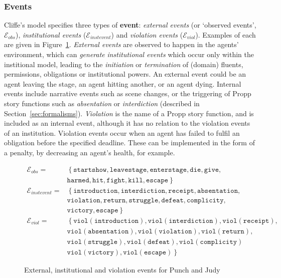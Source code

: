 \documentclass[11pt]{report}
\begin{document}
\subsubsection{Events}
\label{sec:inst-events}
Cliffe's model specifies three types of \textbf{event}: \emph{external events} (or `observed events', $\mathcal{E}_{obs}$), \emph{institutional events} ($\mathcal{E}_{instevent}$) and \emph{violation events} ($\mathcal{E}_{viol}$). Examples of each are given in Figure~\ref{fig:events-pj}.
\emph{External events} are observed to happen in the agents' environment, which can \emph{generate} \emph{institutional events} which occur only within the institional model, leading to the \emph{initiation} or \emph{termination} of (domain) fluents, permissions, obligations or institutional powers.
An external event could be an agent leaving the stage, an agent hitting another, or an agent dying. Internal events include narrative events such as scene changes, or the triggering of Propp story functions such as \emph{absentation} or \emph{interdiction} (described in Section~\ref{sec:formalisms}). \emph{Violation} is the name of a Propp story function, and is included as an internal event, although it has no relation to the violation events of an institution.
Violation events occur when an agent has failed to fulfil an obligation before the specified deadline. These can be implemented in the form of a penalty, by decreasing an agent's health, for example.

\begin{figure}[!t]
\begin{align}
  \mathcal{E}_{obs} =& \left\{\mathtt{startshow, leavestage, enterstage, die, give,}\right.\nonumber\\
  &\left. {} \mathtt{harmed, hit, fight, kill, escape}\right\}\label{eq:eobs}\\
  \mathcal{E}_{instevent} =& \left\{\mathtt{introduction, interdiction, receipt, absentation,}\right.\nonumber\\
                         &\left. {} \mathtt{violation, return, struggle, defeat, complicity,}\right.\nonumber\\
                         &\left. {} \mathtt{victory, escape}\right\}\label{eq:einst}\\
  \mathcal{E}_{viol} =& \left\{\mathtt{viol(introduction), viol(interdiction), viol(receipt),}\right.\nonumber\\
 &\left. {} \mathtt{viol(absentation), viol(violation), viol(return),}\right.\nonumber\\
 &\left. {} \mathtt{viol(struggle), viol(defeat), viol(complicity)}\right.\nonumber\\
 &\left. {} \mathtt{viol(victory), viol(escape)}\right\}\label{eq:viol}
\end{align}
\caption{External, institutional and violation events for Punch and Judy} \label{fig:events-pj}
\end{figure}
\end{document}
